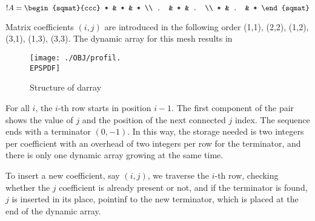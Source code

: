 
\begin{equation} 
  !A = 
\begin{sqmat}{ccc}
      * & * & * \\    
      . & * & . \\    
      * & . & * 
\end{sqmat} 
\end{equation}

Matrix coefficients $(i,j)$ are introduced in the following order (1,1),
(2,2), (1,2), (3,1), (1,3), (3,3).  The dynamic array for this mesh
results in

\begin{figure*}[ht]
\centerline{\texttt{[image: ./OBJ/profil.\\EPSPDF]}}
\caption{Structure of darray}
\label{fg:profil}
\end{figure*}

For all $i$, the $i$-th row starts in position $i-1$. The first
component of the pair shows the value of $j$ and the position of the
next connected $j$ index. The sequence ends with a terminator
$(0,-1)$. In this way, the storage needed is two integers per
coefficient with an overhead of two integers per row for the
terminator, and there is only one dynamic array growing at the same
time. 

To insert a new coefficient, say $(i,j)$, we traverse the $i$-th row,
checking whether the $j$ coefficient is already present or not, and if
the terminator is found, $j$ is inserted in its place, pointinf to the
new terminator, which is placed at the end of the dynamic array.

